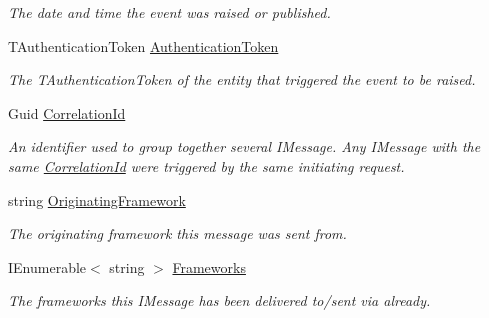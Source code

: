 \begin{DoxyCompactItemize}
\begin{DoxyCompactList}\small\item\em The date and time the event was raised or published. \end{DoxyCompactList}\item 
T\+Authentication\+Token \hyperlink{classCqrs_1_1Events_1_1DtoAggregateEvent_a536e92af26632a9590e2ed590232cfcf_a536e92af26632a9590e2ed590232cfcf}{Authentication\+Token}
\begin{DoxyCompactList}\small\item\em The {\itshape T\+Authentication\+Token}  of the entity that triggered the event to be raised. \end{DoxyCompactList}\item 
Guid \hyperlink{classCqrs_1_1Events_1_1DtoAggregateEvent_a0736560199765e66c50963dfa767b5a5_a0736560199765e66c50963dfa767b5a5}{Correlation\+Id}
\begin{DoxyCompactList}\small\item\em An identifier used to group together several I\+Message. Any I\+Message with the same \hyperlink{classCqrs_1_1Events_1_1DtoAggregateEvent_a0736560199765e66c50963dfa767b5a5_a0736560199765e66c50963dfa767b5a5}{Correlation\+Id} were triggered by the same initiating request. \end{DoxyCompactList}\item 
string \hyperlink{classCqrs_1_1Events_1_1DtoAggregateEvent_a40b1390a4f0441deeb1ef766d6903323_a40b1390a4f0441deeb1ef766d6903323}{Originating\+Framework}
\begin{DoxyCompactList}\small\item\em The originating framework this message was sent from. \end{DoxyCompactList}\item 
I\+Enumerable$<$ string $>$ \hyperlink{classCqrs_1_1Events_1_1DtoAggregateEvent_a58aae5cf252106008695c50ffe994517_a58aae5cf252106008695c50ffe994517}{Frameworks}
\begin{DoxyCompactList}\small\item\em The frameworks this I\+Message has been delivered to/sent via already. \end{DoxyCompactList}\end{DoxyCompactItemize}


